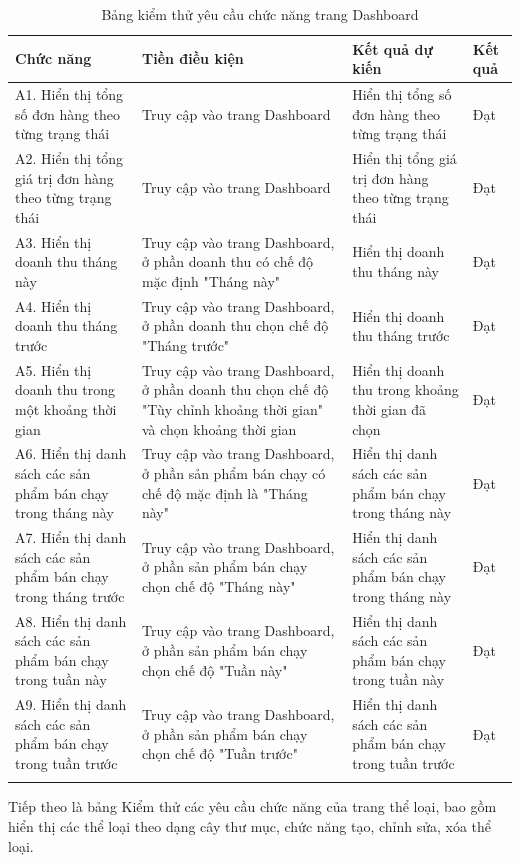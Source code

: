 \begin{longtable}{|p{4cm}|p{4cm}|p{4cm}|p{2cm}|}
    \hline
    Chức năng & Tiền điều kiện & Kết quả dự kiến & Kết quả \\
    \hline
    A1. Hiển thị tổng số đơn hàng theo từng trạng thái & Truy cập vào trang Dashboard & Hiển thị tổng số đơn hàng theo từng trạng thái & Đạt\\
    \hline
     A2. Hiển thị tổng giá trị đơn hàng theo từng trạng thái & Truy cập vào trang Dashboard & Hiển thị tổng giá trị đơn hàng theo từng trạng thái & Đạt\\
    \hline
     A3. Hiển thị doanh thu tháng này & Truy cập vào trang Dashboard, ở phần doanh thu có chế độ mặc định "Tháng này"  & Hiển thị doanh thu tháng này & Đạt\\
     \hline
     A4. Hiển thị doanh thu tháng trước & Truy cập vào trang Dashboard, ở phần doanh thu chọn chế độ "Tháng trước" & Hiển thị doanh thu tháng trước & Đạt \\
     \hline
     A5. Hiển thị doanh thu trong một khoảng thời gian & Truy cập vào trang Dashboard, ở phần doanh thu chọn chế độ "Tùy chỉnh khoảng thời gian" và chọn khoảng thời gian & Hiển thị doanh thu trong khoảng thời gian đã chọn & Đạt \\
     \hline
     A6. Hiển thị danh sách các sản phẩm bán chạy trong tháng này & Truy cập vào trang Dashboard, ở phần sản phẩm bán chạy có chế độ mặc định là "Tháng này" & Hiển thị danh sách các sản phẩm bán chạy trong tháng này & Đạt \\
     \hline 
     A7. Hiển thị danh sách các sản phẩm bán chạy trong tháng trước & Truy cập vào trang Dashboard, ở phần sản phẩm bán chạy chọn chế độ "Tháng này" & Hiển thị danh sách các sản phẩm bán chạy trong tháng này & Đạt \\
     \hline 
     A8. Hiển thị danh sách các sản phẩm bán chạy trong tuần này & Truy cập vào trang Dashboard, ở phần sản phẩm bán chạy chọn chế độ "Tuần này" & Hiển thị danh sách các sản phẩm bán chạy trong tuần này & Đạt \\
     \hline 
     A9. Hiển thị danh sách các sản phẩm bán chạy trong tuần trước & Truy cập vào trang Dashboard, ở phần sản phẩm bán chạy chọn chế độ "Tuần trước" & Hiển thị danh sách các sản phẩm bán chạy trong tuần trước & Đạt \\
    \hline
    \caption{Bảng kiểm thử yêu cầu chức năng trang Dashboard}
\end{longtable}
Tiếp theo là bảng Kiểm thử các yêu cầu chức năng của trang thể loại, bao gồm hiển thị các thể loại theo dạng cây thư mục, chức năng tạo, chỉnh sửa, xóa thể loại.

